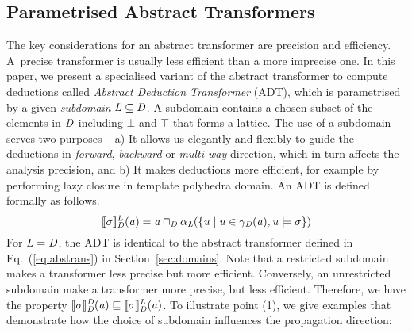 \subsection{Parametrised Abstract Transformers} \label{sec:abst}

The key considerations for an abstract transformer are precision and
efficiency.  A~precise transformer is usually less efficient than a more
imprecise one.  In this paper, we present a specialised variant of the
abstract transformer to compute deductions called \emph{Abstract Deduction
Transformer} (ADT), which is parametrised by a given \emph{subdomain}
$\mathit{L}\subseteq \mathit{D}$.
%
A subdomain contains a chosen subset of the elements in $\mathit{D}$ including
$\bot$ and $\top$ that forms a lattice.
%
The use of a subdomain serves two purposes -- 
  a) It allows us elegantly and flexibly to guide the deductions in 
  {\em forward}, {\em backward} or {\em multi-way} direction, which 
  in turn affects the analysis precision, and 
  b) It makes deductions more efficient, for example by performing lazy closure
  in template polyhedra domain.  
%
An ADT is defined formally  as follows. 
\begin{equation}\label{eq:at2}
\llbracket \sigma \rrbracket_{\mathit{D}}^{\mathit{L}}(\mathit{a})=\mathit{a}\sqcap_{\mathit{D}} \alpha_{\mathit{L}}(\{\mathit{u}\mid \mathit{u}\in\gamma_{\mathit{D}}(\mathit{a}), \mathit{u}\models \sigma\})
\end{equation}
For $\mathit{L}=\mathit{D}$, the ADT is
identical to the abstract transformer defined in
Eq.~(\ref{eq:abstrans}) in Section~\ref{sec:domains}.  Note 
that a restricted subdomain makes a transformer less 
precise but more efficient.  Conversely, an
unrestricted subdomain make a transformer more precise, but less
efficient. Therefore, we have the property
$\llbracket \sigma \rrbracket_{\mathit{D}}^{\mathit{D}}(\mathit{a})\sqsubseteq
\llbracket \sigma \rrbracket_{\mathit{D}}^{\mathit{L}}(\mathit{a})$.
%
To illustrate point (1), 
we give examples that demonstrate how the choice of
subdomain influences the propagation direction:

